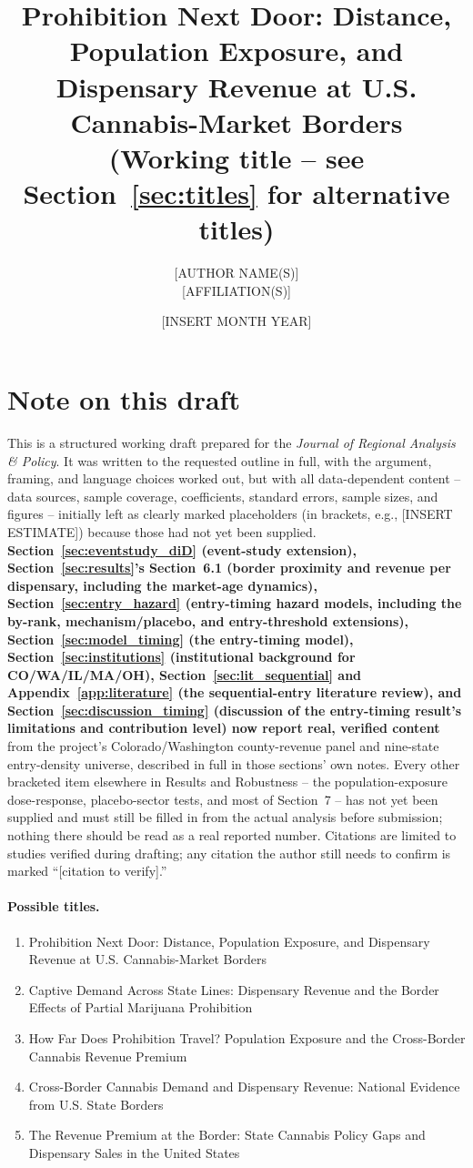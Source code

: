 \documentclass[12pt]{article}
\title{Prohibition Next Door: Distance, Population Exposure, and Dispensary Revenue at U.S. Cannabis-Market Borders \\
{\large (Working title -- see Section~\ref{sec:titles} for alternative titles)}}
\author{[AUTHOR NAME(S)] \\ {}[AFFILIATION(S)]}
\date{[INSERT MONTH YEAR]}
\begin{document}
\maketitle

\section*{Note on this draft}
\label{sec:titles}
This is a structured working draft prepared for the \textit{Journal of Regional Analysis \& Policy}. It was
written to the requested outline in full, with the argument, framing, and language choices worked out, but
with all data-dependent content -- data sources, sample coverage, coefficients, standard errors, sample
sizes, and figures -- initially left as clearly marked placeholders (in brackets, e.g., [INSERT ESTIMATE])
because those had not yet been supplied. \textbf{Section~\ref{sec:eventstudy_diD} (event-study extension), Section~\ref{sec:results}'s Section~6.1
(border proximity and revenue per dispensary, including the market-age dynamics), Section~\ref{sec:entry_hazard}
(entry-timing hazard models, including the by-rank, mechanism/placebo, and entry-threshold extensions),
Section~\ref{sec:model_timing} (the entry-timing model), Section~\ref{sec:institutions} (institutional
background for CO/WA/IL/MA/OH), Section~\ref{sec:lit_sequential} and Appendix~\ref{app:literature} (the
sequential-entry literature review), and Section~\ref{sec:discussion_timing} (discussion of the entry-timing
result's limitations and contribution level) now report real, verified content} from the project's
Colorado/Washington county-revenue panel and nine-state entry-density universe, described in full in those
sections' own notes. Every other bracketed item elsewhere in Results and Robustness -- the population-exposure
dose-response, placebo-sector tests, and most of Section~7 -- has not yet been supplied and must still be
filled in from the actual analysis before submission; nothing there should be read as a real reported number. Citations are limited to studies
verified during drafting; any citation the author still needs to confirm is marked ``[citation to
verify].''

\paragraph{Possible titles.}
\begin{enumerate}[label=(\arabic*)]
  \item Prohibition Next Door: Distance, Population Exposure, and Dispensary Revenue at U.S. Cannabis-Market Borders
  \item Captive Demand Across State Lines: Dispensary Revenue and the Border Effects of Partial Marijuana Prohibition
  \item How Far Does Prohibition Travel? Population Exposure and the Cross-Border Cannabis Revenue Premium
  \item Cross-Border Cannabis Demand and Dispensary Revenue: National Evidence from U.S. State Borders
  \item The Revenue Premium at the Border: State Cannabis Policy Gaps and Dispensary Sales in the United States
\end{enumerate}
\end{document}
